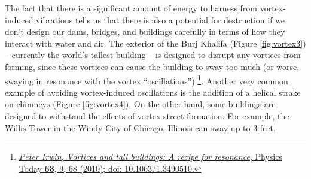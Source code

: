 \documentclass[11pt]{article}
\begin{document}
The fact that there is a significant amount of energy to harness from vortex-induced vibrations tells us that there is also a potential for destruction if we don't design our dams, bridges, and buildings carefully in terms of how they interact with water and air. The exterior of the Burj Khalifa (Figure \ref{fig:vortex3}) -- currently the world's tallest building -- is designed to disrupt any vortices from forming, since these vortices can cause the building to sway too much (or worse, swaying in resonance with the vortex ``oscillations'') \footnote{\href{https://physicstoday.scitation.org/doi/pdf/10.1063/1.3490510}{\textit{Peter Irwin, Vortices and tall buildings: A recipe for resonance},  Physics Today \textbf{63}, 9, 68 (2010); doi: 10.1063/1.3490510.}}. Another very common example of avoiding vortex-induced oscillations is the addition of a helical strake on chimneys (Figure \ref{fig:vortex4}). On the other hand, some buildings are designed to withstand the effects of vortex street formation. For example, the Willis Tower in the Windy City of Chicago, Illinois can sway up to 3 feet. 
\end{document}
